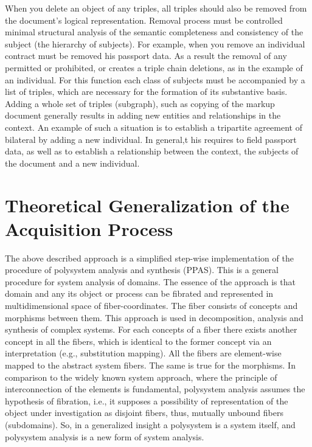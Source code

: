 \documentclass[conference]{IEEEtran}
\begin{document}
	When you delete an object of any triples, all triples should also be removed from the document's logical representation. Removal process must be controlled minimal structural analysis of the semantic completeness and consistency of the subject (the hierarchy of subjects). For example, when you remove an individual contract must be removed his passport data. As a result the removal of any permitted or prohibited, or creates a triple chain deletions, as in the example of an individual. For this function each class of subjects must be accompanied by a list of triples, which are necessary for the formation of its substantive basis.
	Adding a whole set of triples (subgraph), such as copying of the markup document generally results in adding new entities and relationships in the context. An example of such a situation is to establish a tripartite agreement of bilateral by adding a new individual. In general,t his requires to field passport data, as well as to establish a relationship between the context, the subjects of the document and a new individual.



\section{Theoretical Generalization of the Acquisition Process}

The above described approach is a simplified step-wise implementation
of the procedure of polysystem analysis and synthesis \cite{father}
(PPAS).  This is a general procedure for system analysis of domains.
The essence of the approach is that domain and any its object or
process can be fibrated and represented in multidimensional space of
fiber-coordinates.  The fiber consists of concepts and morphisms
between them.  This approach is used in decomposition, analysis and
synthesis of complex systems.  For each concepts of a fiber there
exists another concept in all the fibers, which is identical to the
former concept via an interpretation (e.g., substitution mapping).
All the fibers are element-wise mapped to the abstract system fibers.
The same is true for the morphisms.  In comparison to the widely known
system approach, where the principle of interconnection of the
elements is fundamental, polysystem analysis assumes the hypothesis of
fibration, i.e., it supposes a possibility of representation of the
object under investigation as disjoint fibers, thus, mutually unbound
fibers (subdomains).  So, in a generalized insight a polysystem is a
system itself, and polysystem analysis is a new form of system
analysis.
\end{document}
